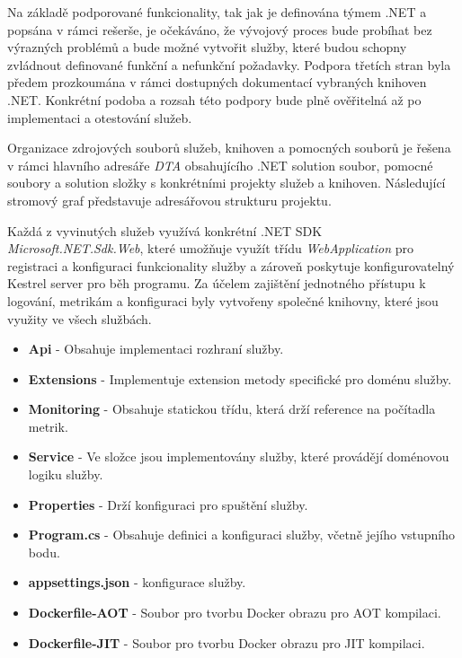 
Na základě podporované funkcionality, tak jak je definována týmem .NET a popsána v rámci rešerše, je očekáváno, že vývojový proces bude probíhat bez výrazných problémů a bude možné vytvořit služby, které budou schopny zvládnout definované funkční a nefunkční požadavky. Podpora třetích stran byla předem prozkoumána v rámci dostupných dokumentací vybraných knihoven .NET. Konkrétní podoba a rozsah této podpory bude plně ověřitelná až po implementaci a otestování služeb.


Organizace zdrojových souborů služeb, knihoven a pomocných souborů je řešena v rámci hlavního adresáře \emph{DTA} obsahujícího .NET solution soubor, pomocné soubory a solution složky s konkrétními projekty služeb a knihoven. Následující stromový graf představuje adresářovou strukturu projektu.


Každá z vyvinutých služeb využívá konkrétní .NET SDK \emph{Microsoft.NET.Sdk.Web}, které umožňuje využít třídu \emph{WebApplication} pro registraci a konfiguraci funkcionality služby a zároveň poskytuje konfigurovatelný Kestrel server pro běh programu. Za účelem zajištění jednotného přístupu k logování, metrikám a konfiguraci byly vytvořeny společné knihovny, které jsou využity ve všech službách.


\begin{itemize}
  \item \textbf{Api} - Obsahuje implementaci rozhraní služby.
  \item \textbf{Extensions} - Implementuje extension metody specifické pro doménu služby.
  \item \textbf{Monitoring} - Obsahuje statickou třídu, která drží reference na počítadla metrik.
  \item \textbf{Service} - Ve složce jsou implementovány služby, které provádějí doménovou logiku služby.
  \item \textbf{Properties} - Drží konfiguraci pro spuštění služby.
  \item \textbf{Program.cs} - Obsahuje definici a konfiguraci služby, včetně jejího vstupního bodu.
  \item \textbf{appsettings.json} - konfigurace služby.
  \item \textbf{Dockerfile-AOT} - Soubor pro tvorbu Docker obrazu pro AOT kompilaci.
  \item \textbf{Dockerfile-JIT} - Soubor pro tvorbu Docker obrazu pro JIT kompilaci.
\end{itemize}


